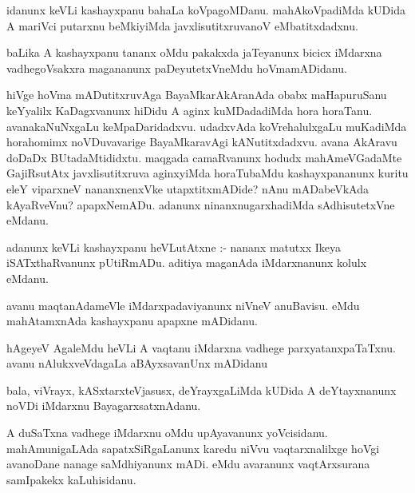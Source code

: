 \documentclass{article}
\begin{document}
\begin{mn}
idanunx keVLi  kashayxpanu  bahaLa koVpagoMDanu.  mahAkoVpadiMda kUDida 
A mariVci putarxnu beMkiyiMda javxlisutitxruvanoV eMbatitxdadxnu.
\end{mn}

\begin{mn}
baLika A kashayxpanu tananx oMdu pakakxda jaTeyanunx bicicx iMdarxna 
vadhegoVsakxra magananunx paDeyutetxVneMdu hoVmamADidanu. 
\end{mn}

\begin{mn}
hiVge hoVma mADutitxruvAga BayaMkarAkAranAda obabx maHapuruSanu keYyalilx 
KaDagxvanunx hiDidu A aginx kuMDadadiMda hora horaTanu.  avanakaNuNxgaLu 
keMpaDaridadxvu.  udadxvAda koVrehalulxgaLu muKadiMda horahomimx  noVDuvavarige 
BayaMkaravAgi kANutitxdadxvu.  avana AkAravu doDaDx BUtadaMtididxtu.  maqgada 
camaRvanunx hodudx mahAmeVGadaMte GajiRsutAtx javxlisutitxruva aginxyiMda 
horaTubaMdu kashayxpananunx  kuritu eleY viparxneV nananxnenxVke utapxtitxmADide?  
nAnu mADabeVkAda  kAyaRveVnu?  apapxNemADu.  adanunx ninanxnugarxhadiMda 
sAdhisutetxVne eMdanu.
\end{mn}

\begin{mn}
adanunx  keVLi kashayxpanu  heVLutAtxne :- nananx matutxx Ikeya iSATxthaRvanunx 
pUtiRmADu.  aditiya  maganAda  iMdarxnanunx kolulx eMdanu. 
\end{mn}

\begin{mn}
avanu maqtanAdameVle  iMdarxpadaviyanunx  niVneV anuBavisu. eMdu mahAtamxnAda  
kashayxpanu  apapxne mADidanu. 
\end{mn}

\begin{mn}
hAgeyeV AgaleMdu heVLi A vaqtanu  iMdarxna vadhege parxyatanxpaTaTxnu.  
avanu nAlukxveVdagaLa aBAyxsavanUnx mADidanu
\end{mn}

\begin{mn}
bala, viVrayx, kASxtarxteVjasusx, deYrayxgaLiMda kUDida A deYtayxnanunx 
noVDi iMdarxnu BayagarxsatxnAdanu.
\end{mn}

\begin{mn}
A duSaTxna vadhege iMdarxnu oMdu upAyavanunx yoVcisidanu.  mahAmunigaLAda 
sapatxSiRgaLanunx karedu niVvu vaqtarxnalilxge hoVgi avanoDane nanage 
saMdhiyanunx mADi.  eMdu avaranunx vaqtArxsurana samIpakekx kaLuhisidanu.
\end{mn}
\end{document}
